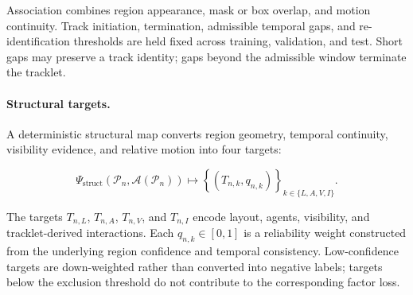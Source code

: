 Association combines region appearance, mask or box overlap, and
motion continuity. Track initiation, termination, admissible temporal
gaps, and re-identification thresholds are held fixed across training,
validation, and test. Short gaps may preserve a track identity; gaps
beyond the admissible window terminate the tracklet.

\paragraph{Structural targets.}
A deterministic structural map converts region geometry, temporal
continuity, visibility evidence, and relative motion into four targets:

\[
\Psi_{\mathrm{struct}}
\left(
\mathcal P_n,\mathcal A(\mathcal P_n)
\right)
\longmapsto
\left\{
\left(T_{n,k},q_{n,k}\right)
\right\}_{k\in\{L,A,V,I\}} .
\]

The targets \(T_{n,L}\), \(T_{n,A}\), \(T_{n,V}\), and \(T_{n,I}\)
encode layout, agents, visibility, and tracklet-derived interactions.
Each \(q_{n,k}\in[0,1]\) is a reliability weight constructed from the
underlying region confidence and temporal consistency. Low-confidence
targets are down-weighted rather than converted into negative labels;
targets below the exclusion threshold do not contribute to the
corresponding factor loss.

